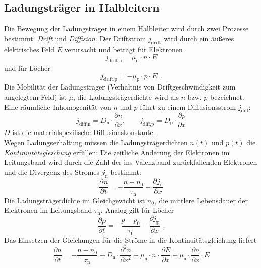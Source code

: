 \subsection{Ladungsträger in Halbleitern}

Die Bewegung der Ladungsträger in einem Halbleiter wird durch zwei Prozesse bestimmt:
\emph{Drift} und \emph{Diffision}.
Der Driftstrom $j_{\text{drift}}$ wird durch ein äußeres elektrisches Feld $E$ verursacht
und beträgt für Elektronen
\begin{equation}
\label{}
j_{\text{drift,n}}=\mu_{\text{n}} \cdot n \cdot E
\end{equation}
und für Löcher
\begin{equation}
\label{}
j_{\text{drift,p}}=-\mu_{\text{p}} \cdot p \cdot E \ \, .
\end{equation}
Die Mobilität der Ladungsträger (Verhältnis von Driftgeschwindigkeit zum angelegtem Feld) ist $\mu$,
die Ladungsträgerdichte wird als $n$ bzw. $p$ bezeichnet.
Eine räumliche Inhomogenität von $n$ und $p$ führt zu einem Diffusionsstrom $j_{\text{diff}}$:
\begin{equation}
\label{}
j_{\text{diff,n}}=D_{\text{n}} \cdot \frac{\partial n}{\partial x},
\qquad j_{\text{diff,p}}=D_{\text{p}} \cdot \frac{\partial p}{\partial x}
\end{equation}
$D$ ist die materialspezifische Diffusionskonstante.\\
Wegen Ladungserhaltung müssen die Ladungsträgerdichten $n(t)$ und $p(t)$ die
\emph{Kontinuitätsgleichung} erfüllen:
Die zeitliche Änderung der Elektronen im Leitungsband wird durch die Zahl der ins Valenzband
zurückfallenden Elektronen und die Divergenz des Stromes $j_{\text{n}}$ bestimmt:
\begin{equation}
\label{}
\frac{\partial n}{\partial t}= -\frac{n-n_0}{\tau_{\text{n}}}-\frac{\partial j_{\text{n}}}{\partial x}
\end{equation}
Die Ladungsträgerdichte im Gleichgewicht ist $n_0$, die mittlere Lebensdauer der Elektronen
im Leitungsband $\tau_{\text{n}}$. Analog gilt für Löcher
\begin{equation}
\label{}
\frac{\partial p}{\partial t}= -\frac{p-p_0}{\tau_{\text{p}}}-\frac{\partial j_{\text{p}}}{\partial x} \ \, .
\end{equation}
Das Einsetzen der Gleichungen für die Ströme in die Kontinuitätsgleichung liefert
\begin{equation}
\label{}
\frac{\partial n}{\partial t}=
-\frac{n-n_0}{\tau_{\text{n}}}
+ D_{\text{n}} \cdot \frac{\partial^2 n}{\partial x^2}
+ \mu_{\text{n}} \cdot n \cdot \frac{\partial E}{\partial x}
+ \mu_{\text{n}} \cdot \frac{\partial n}{\partial x} \cdot E
\end{equation}
